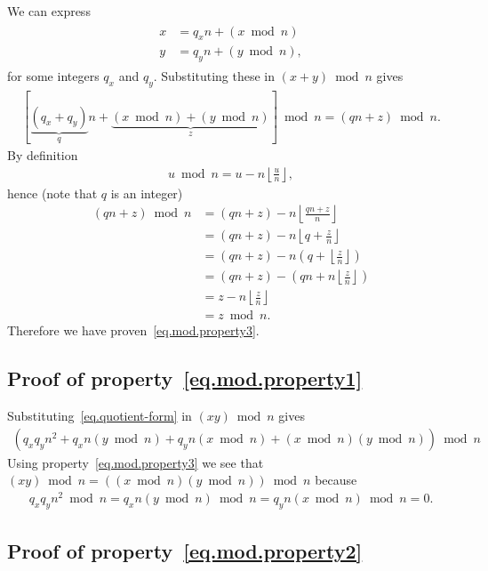 \documentclass[12pt,a4paper]{article}
\newcommand{\floor}[1]{\left\lfloor #1 \right\rfloor}
\begin{document}
We can express
\begin{align} \label{eq.quotient-form}
  \begin{split}
    x &= q_xn + (x \bmod n) \\
    y &= q_yn + (y \bmod n),
  \end{split}
\end{align}
for some integers $q_x$ and $q_y$. Substituting these in $(x + y) \bmod n$ gives
\begin{align*}
  \left[\underbrace{(q_x + q_y)}_{q}n + \underbrace{(x \bmod n) + (y \bmod n)}_z\right] \bmod n = (qn + z) \bmod n.
\end{align*}
By definition
\begin{align*}
  u \bmod n = u - n\floor{\frac{u}{n}},
\end{align*}
hence (note that $q$ is an integer)
\begin{align*}
  (qn + z) \bmod n
  &= (qn + z) - n\floor{\frac{qn + z}{n}} \\
  &= (qn + z) - n\floor{q + \frac{z}{n}} \\
  &= (qn + z) - n\left(q + \floor{\frac{z}{n}}\right) \\
  &= (qn + z) - \left(qn + n\floor{\frac{z}{n}}\right) \\
  &= z - n\floor{\frac{z}{n}} \\
  &= z\bmod n.
\end{align*}
Therefore we have proven~\eqref{eq.mod.property3}.

\subsection{Proof of property~\eqref{eq.mod.property1}}

Substituting~\eqref{eq.quotient-form} in $(xy)\bmod n$ gives
\begin{align*}
  (q_xq_yn^2 + q_xn(y \bmod n) + q_yn(x \bmod n) + (x \bmod n)(y \bmod n))\bmod n
\end{align*}
Using property~\eqref{eq.mod.property3} we see that $(xy)\bmod n = ((x \bmod n)(y \bmod n))\bmod n$ because
\begin{align*}
  q_xq_yn^2\bmod n = q_xn(y \bmod n)\bmod n = q_yn(x \bmod n)\bmod n = 0.
\end{align*}

\subsection{Proof of property~\eqref{eq.mod.property2}}
\end{document}
